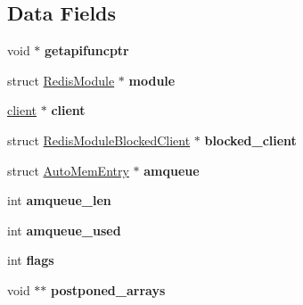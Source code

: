 \subsection*{Data Fields}
\begin{DoxyCompactItemize}
\item 
\mbox{\label{structRedisModuleCtx_a9d053af6af362dd108a36b202784ff05}} 
void $\ast$ {\bfseries getapifuncptr}
\item 
\mbox{\label{structRedisModuleCtx_a5c03066457fbd2c83b4cbc7e40d8f01f}} 
struct \hyperlink{structRedisModule}{Redis\+Module} $\ast$ {\bfseries module}
\item 
\mbox{\label{structRedisModuleCtx_a6611174e7e278988753fb5315a91358b}} 
\hyperlink{structclient}{client} $\ast$ {\bfseries client}
\item 
\mbox{\label{structRedisModuleCtx_a77721d5d1e02aa3eb72262caf0533efc}} 
struct \hyperlink{structRedisModuleBlockedClient}{Redis\+Module\+Blocked\+Client} $\ast$ {\bfseries blocked\+\_\+client}
\item 
\mbox{\label{structRedisModuleCtx_a08a69ec65266a11f231a847378d79385}} 
struct \hyperlink{structAutoMemEntry}{Auto\+Mem\+Entry} $\ast$ {\bfseries amqueue}
\item 
\mbox{\label{structRedisModuleCtx_ac5099d347fe1ac8f018f04b3149cd864}} 
int {\bfseries amqueue\+\_\+len}
\item 
\mbox{\label{structRedisModuleCtx_aa38e50308a70dcc2b288352211ae38b8}} 
int {\bfseries amqueue\+\_\+used}
\item 
\mbox{\label{structRedisModuleCtx_abbfd3bcd0414e1a62a4c16c7adb2801a}} 
int {\bfseries flags}
\item 
\mbox{\label{structRedisModuleCtx_a43751d993bfe496f87440891e8f5208f}} 
void $\ast$$\ast$ {\bfseries postponed\+\_\+arrays}
\item 
\mbox{\label{structRedisModuleCtx_a471a8b2f1332e52ac8696576bef723bb}} 
$$
\end{DoxyCompactItemize}
